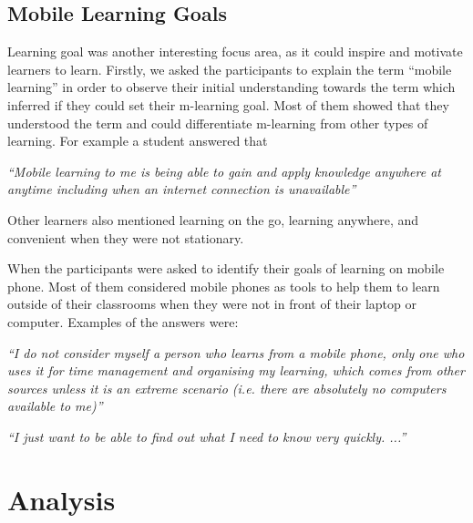 \subsection{Mobile Learning Goals} 
Learning goal was another interesting focus area, as it could inspire and motivate learners to learn. Firstly, we asked the participants to explain the term ``mobile learning'' in order to observe their initial understanding towards the term which inferred if they could set their m-learning goal. Most of them showed that they understood the term and could differentiate m-learning from other types of learning. For example a student answered that 
\newline 
\begin{addmargin}[1.5em]{1.5em}
\textit{``Mobile learning to me is being able to gain and apply knowledge anywhere at anytime including when an internet connection is unavailable''}
\end{addmargin}\hfill

Other learners also mentioned learning on the go, learning anywhere, and convenient when they were not stationary. 

When the participants were asked to identify their goals of learning on mobile phone. Most of them considered mobile phones as tools to help them to learn outside of their classrooms when they were not in front of their laptop or computer. Examples of the answers were: 
\newline 
\begin{addmargin}[1.5em]{1.5em}
\textit{``I do not consider myself a person who learns from a mobile phone, only one who uses it for time management and organising my learning, which comes from other sources unless it is an extreme scenario (i.e. there are absolutely no computers available to me)''}
\end{addmargin}

\hfill
\begin{addmargin}[1.5em]{1.5em}
\textit{``I just want to be able to find out what I need to know very quickly. ...''}
\end{addmargin}\hfill 



\section{Analysis}

